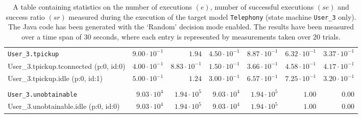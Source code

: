 \begin{table}[htbp]
{\begin{tabular}{lrrrrrr}
\\[-8pt]\texttt{User\_3.tpickup}                      & $9.00 \cdot 10^{-1}$ &               $1.94$ & $4.50 \cdot 10^{-1}$ & $8.87 \cdot 10^{-1}$ & $6.32 \cdot 10^{-1}$ & $3.37 \cdot 10^{-1}$ \\
\hspace{3mm}User\_3.tpickup.tconnected (p:0, id:0)    & $4.00 \cdot 10^{-1}$ & $8.83 \cdot 10^{-1}$ & $1.50 \cdot 10^{-1}$ & $3.66 \cdot 10^{-1}$ & $4.58 \cdot 10^{-1}$ & $4.17 \cdot 10^{-1}$ \\
\hspace{3mm}User\_3.tpickup.idle (p:0, id:1)          & $5.00 \cdot 10^{-1}$ &               $1.24$ & $3.00 \cdot 10^{-1}$ & $6.57 \cdot 10^{-1}$ & $7.25 \cdot 10^{-1}$ & $3.20 \cdot 10^{-1}$ \\
\\[-8pt]\texttt{User\_3.unobtainable}                 &  $9.03 \cdot 10^{4}$ &  $1.94 \cdot 10^{5}$ &  $9.03 \cdot 10^{4}$ &  $1.94 \cdot 10^{5}$ &               $1.00$ &               $0.00$ \\
\hspace{3mm}User\_3.unobtainable.idle (p:0, id:0)     &  $9.03 \cdot 10^{4}$ &  $1.94 \cdot 10^{5}$ &  $9.03 \cdot 10^{4}$ &  $1.94 \cdot 10^{5}$ &               $1.00$ &               $0.00$ \\
\bottomrule
\end{tabular}
}
\caption{A table containing statistics on the number of executions $(e)$, number of successful executions $(se)$ and success ratio $(sr)$ measured during the execution of the target model \texttt{Telephony} (state machine \texttt{User\_3} only). The Java code has been generated with the `Random' decision mode enabled. The results have been measured over a time span of 30 seconds, where each entry is represented by measurements taken over 20 trials.}
\label{table:frequency_results_telephony_random_user_3}
\end{table}